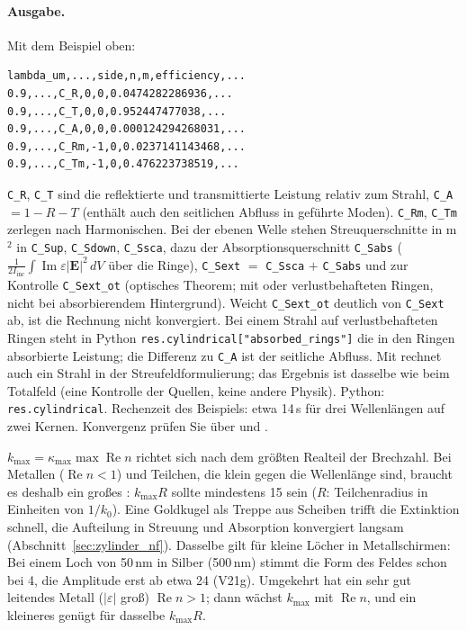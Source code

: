 \paragraph{Ausgabe.} Mit dem Beispiel oben:
\begin{lstlisting}
lambda_um,...,side,n,m,efficiency,...
0.9,...,C_R,0,0,0.0474282286936,...
0.9,...,C_T,0,0,0.952447477038,...
0.9,...,C_A,0,0,0.000124294268031,...
0.9,...,C_Rm,-1,0,0.0237141143468,...
0.9,...,C_Tm,-1,0,0.476223738519,...
\end{lstlisting}
\texttt{C\_R}, \texttt{C\_T} sind die reflektierte und transmittierte Leistung relativ zum Strahl, \texttt{C\_A}
$=1-R-T$ (enthält auch den seitlichen Abfluss in geführte Moden). \texttt{C\_Rm}, \texttt{C\_Tm} zerlegen nach
Harmonischen. Bei der ebenen Welle stehen Streuquerschnitte in \textmu m$^2$ in \texttt{C\_Sup}, \texttt{C\_Sdown},
\texttt{C\_Ssca}, dazu der Absorptionsquerschnitt \texttt{C\_Sabs} ($\tfrac1{2I_{\text{inc}}}\int\operatorname{Im}\varepsilon
|\mathbf E|^2\,dV$ über die Ringe), \texttt{C\_Sext} $=$ \texttt{C\_Ssca} $+$ \texttt{C\_Sabs} und zur Kontrolle
\texttt{C\_Sext\_ot} (optisches Theorem; mit  oder verlustbehafteten Ringen, nicht bei
absorbierendem Hintergrund). Weicht \texttt{C\_Sext\_ot}
deutlich von \texttt{C\_Sext} ab, ist die Rechnung nicht konvergiert. Bei einem Strahl auf verlustbehafteten Ringen
steht in Python \texttt{res.cylindrical["absorbed\_rings"]} die in den Ringen absorbierte Leistung; die Differenz zu
\texttt{C\_A} ist der seitliche Abfluss. Mit  rechnet auch ein Strahl in der
Streufeldformulierung; das Ergebnis ist dasselbe wie beim Totalfeld (eine Kontrolle der Quellen, keine andere Physik).
Python: \texttt{res.cylindrical}. Rechenzeit des Beispiels: etwa 14\,s für
drei Wellenlängen auf zwei Kernen. Konvergenz prüfen Sie über  und .

\begin{achtung}
$k_{\max}=\kappa_{\max}\max\operatorname{Re}n$ richtet sich nach dem größten Realteil der Brechzahl. Bei Metallen
($\operatorname{Re}n<1$) und Teilchen, die klein gegen die Wellenlänge sind, braucht es deshalb ein großes
: $k_{\max}R$ sollte mindestens 15 sein ($R$: Teilchenradius in Einheiten von $1/k_0$). Eine Goldkugel
als Treppe aus Scheiben trifft die Extinktion schnell, die Aufteilung in Streuung und Absorption konvergiert langsam
(Abschnitt~\ref{sec:zylinder_nf}). Dasselbe gilt für kleine Löcher in Metallschirmen: Bei einem Loch von
50\,nm in Silber (500\,nm) stimmt die Form des Feldes schon bei  4, die Amplitude erst ab etwa 24
(V21g). Umgekehrt hat ein sehr gut leitendes Metall ($|\varepsilon|$ groß) $\operatorname{Re}n>1$; dann wächst
$k_{\max}$ mit $\operatorname{Re}n$, und ein kleineres  genügt für dasselbe $k_{\max}R$.
\end{achtung}

